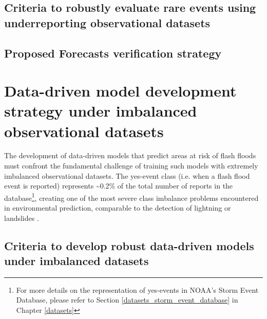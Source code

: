 \subsection{Criteria to robustly evaluate rare events using underreporting observational datasets}


\subsection{Proposed Forecasts verification strategy}








\section{Data-driven model development strategy under imbalanced observational datasets}
\label{experimental_design_model_dev_imbalanced_data}

The development of data-driven models that predict areas at risk of flash floods must confront the fundamental challenge of training such models with extremely imbalanced observational datasets. The yes-event class (i.e. when a flash flood event is reported) represents \sim0.2\% of the total number of reports in the database\footnote{For more details on the representation of yes-events in NOAA's Storm Event Database, please refer to Section \ref{datasets_storm_event_database} in Chapter \ref{datasets}}, creating one of the most severe class imbalance problems encountered in environmental prediction, comparable to the detection of lightning \citep{Cavaiola_2024} or landslides \citep{Xu_2022, Agrawal_2017, Zhang_2022, Gupta_2023}. 

\subsection{Criteria to develop robust data-driven models under imbalanced datasets}

